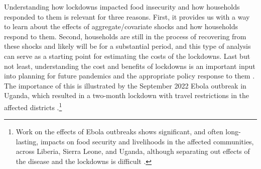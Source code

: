 \documentclass{wber}
\begin{document}
Understanding how lockdowns impacted food insecurity and how households
responded to them is relevant for three reasons. First, it provides us
with a way to learn about the effects of aggregate/covariate shocks and
how households respond to them. Second, households are still in the
process of recovering from these shocks and likely will be for a
substantial period, and this type of analysis can serve as a starting
point for estimating the costs of the lockdowns. Last but not least,
understanding the cost and benefits of lockdowns is an important input
into planning for future pandemics and the appropriate policy response
to them \citep{World-Health-Organization2022}. The importance of this is
illustrated by the September 2022 Ebola outbreak in Uganda, which
resulted in a two-month lockdown with travel restrictions in the
affected districts
\citep{Makerere-University-School-of-Statistics-and-Planning2023}.\footnote{Work
  on the effects of Ebola outbreaks shows significant, and often
  long-lasting, impacts on food security and livelihoods in the affected
  communities, across Liberia, Sierra Leone, and Uganda, although
  separating out effects of the disease and the lockdowns is difficult
  \citep{Langlay2014, Himelein2015, Gatiso2018, Djomaleu2022, Makerere-University-School-of-Statistics-and-Planning2023}.}
\end{document}
